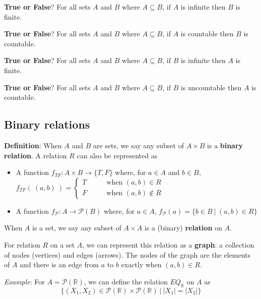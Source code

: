 \documentclass[12pt, oneside]{article}
\begin{document}
{\bf True or False}?  For all sets $A$ and $B$ where  $A \subseteq B$, 
if $A$ is infinite then $B$ is finite.

\vfill

{\bf True or False}?   For all sets $A$ and $B$ where  $A \subseteq B$, 
if $A$ is countable then $B$ is countable.

\vfill

{\bf True or False}?   For all sets $A$ and $B$ where  $A \subseteq B$, 
if $B$ is infinite then $A$ is finite.

\vfill

{\bf True or False}?   For all sets $A$ and $B$ where  $A \subseteq B$, 
if $B$ is uncountable then $A$ is countable.

\vfill \newpage

\newpage
\subsection*{Binary relations}


{\bf Definition}: When $A$ and $B$ are sets, we say any subset of $A \times B$ is a {\bf binary relation}. 
A relation $R$ can also be represented as

\begin{itemize}
\item A function $f_{TF} : A \times B \to \{T, F\}$
where, for $a \in A$ and $b \in B$, $f_{TF}(~(a,b)~) = 
\begin{cases} 
    T \qquad&\text{when } (a,b) \in R \\
    F \qquad&\text{when } (a,b) \notin R
\end{cases}$
\item A function $f_{\mathcal{P}} : A   \to \mathcal{P}(B)$ where, for $a \in A$, 
$f_{\mathcal{P}}( a ) = \{ b \in B ~|~ (a,b) \in R \}$
\end{itemize}

When $A$ is a set, we say any subset of $A \times A$ is a (binary) {\bf relation} on $A$.

 \vfill


For relation $R$ on a set $A$, we can represent this relation as a
{\bf graph}: a collection of nodes (vertices) and edges (arrows). The 
nodes of the graph are the elements of $A$ and 
there is an edge from $a$ to $b$ exactly when $(a,b) \in R$.
 \vfill
\newpage


{\it Example}: For $A = \mathcal{P}(\mathbb{R})$, we can define the relation $EQ_{\mathbb{R}}$ on $A$ as 
\[
\{ (X_1, X_2 ) \in\mathcal{P}(\mathbb{R})  \times \mathcal{P}(\mathbb{R}) ~|~ |X_1| = |X_2| \}
\]
\end{document}
